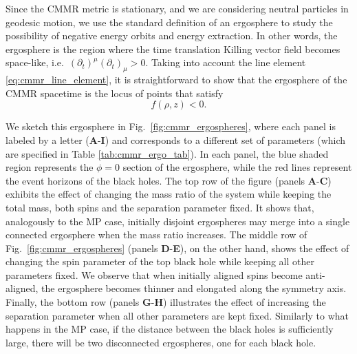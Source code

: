 Since the CMMR metric is stationary, and we are considering neutral particles in geodesic motion, we use the standard definition of an ergosphere to study the possibility of negative energy orbits and energy extraction. In other words, the ergosphere is the region where the time translation Killing vector field becomes space-like, i.e.~$(\partial_t)^\mu (\partial_t)_\mu > 0$. Taking into account the line element \eqref{eq:cmmr_line_element}, it is straightforward to show that the ergosphere of the CMMR spacetime is the locus of points that satisfy
%
\begin{equation}
  f(\rho,z) < 0.
  \label{eq:cmmr_ergo_ineq}
\end{equation}

We sketch this ergosphere in Fig.~\ref{fig:cmmr_ergospheres}, where each panel is labeled by a letter (\textbf{A}-\textbf{I}) and corresponds to a different set of parameters (which are specified in Table \ref{tab:cmmr_ergo_tab}). In each panel, the blue shaded region represents the $\phi = 0$ section of the ergosphere, while the red lines represent the event horizons of the black holes. The top row of the figure (panels \textbf{A}-\textbf{C}) exhibits the effect of changing the mass ratio of the system while keeping the total mass, both spins and the separation parameter fixed. It shows that, analogously to the MP case, initially disjoint ergospheres may merge into a single connected ergosphere when the mass ratio increases. The middle row of Fig.~\ref{fig:cmmr_ergospheres} (panels \textbf{D}-\textbf{E}), on the other hand, shows the effect of changing the spin parameter of the top black hole while keeping all other parameters fixed. We observe that when initially aligned spins become anti-aligned, the ergosphere becomes thinner and elongated along the symmetry axis. Finally, the bottom row (panels \textbf{G}-\textbf{H}) illustrates the effect of increasing the separation parameter when all other parameters are kept fixed. Similarly to what happens in the MP case, if the distance between the black holes is sufficiently large, there will be two disconnected ergospheres, one for each black hole.

